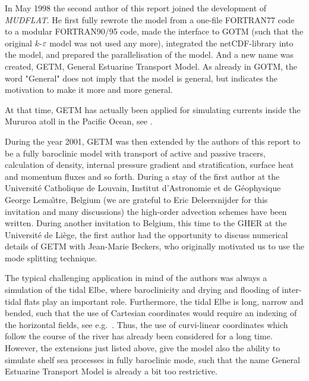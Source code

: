 In May 1998 the second author of this report joined the development of
{\it MUDFLAT}. He first fully rewrote the model from a one-file FORTRAN77 code
to a modular FORTRAN90/95 code,
made the interface to GOTM (such that the original $k$-$\varepsilon$ model
was not used any more), integrated the netCDF-library into the model,
and prepared the parallelisation of the model. 
And a new name was created, GETM, General Estuarine Transport Model. 
As already in GOTM, the word "General" does not imply that the model
is general, but indicates the motivation to make it more and more general. 

At that time, GETM has actually been applied for simulating currents inside
the Mururoa atoll in the Pacific Ocean, see \cite{MATHIEUea01}. 

During the year 2001, GETM was then extended by the authors
of this report to be a fully baroclinic
model with transport of active and passive tracers, calculation of
density, internal pressure gradient and stratification, surface heat and
momentum fluxes and so forth. During a stay of the first author
at the Universit\'e Catholique de Louvain,
Institut d'As\-tro\-no\-mie et de G\'eophysique George Lema\^\i tre,
Belgium (we are grateful to Eric Deleersnijder for this
invitation and many discussions) the high-order advection schemes have
been written. 
During another invitation to Belgium, this time to the
GHER at the Universit\'e de Li\`ege, the first author had the
opportunity to discuss numerical details of GETM with Jean-Marie
Beckers, who originally motivated us to use the mode splitting technique. 

The typical challenging application
in mind of the authors was always a simulation of the tidal Elbe,
where baroclinicity and drying and flooding of inter-tidal flats play
an important role. Furthermore, the tidal Elbe is long, narrow  and bended,
such that the use of Cartesian coordinates would require an indexing
of the horizontal fields, see e.g.\ \cite{DUWE88}. Thus, the use of
curvi-linear coordinates which follow the course of the river
has already been considered for a long time.   
However, the extensions just listed above, give the model also the
ability to simulate shelf sea processes in fully baroclinic mode,
such that the name General Estuarine Transport Model is already 
a bit too restrictive. 
